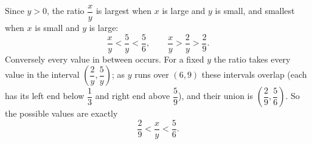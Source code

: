 Since $y>0$, the ratio $\dfrac{x}{y}$ is largest when $x$ is large and $y$ is small, and smallest when $x$ is small and $y$ is large:
\[
\dfrac{x}{y}<\dfrac{5}{y}<\dfrac{5}{6},\qquad \dfrac{x}{y}>\dfrac{2}{y}>\dfrac{2}{9}.
\]
Conversely every value in between occurs. For a fixed $y$ the ratio takes every value in the interval $\left(\dfrac{2}{y},\dfrac{5}{y}\right)$; as $y$ runs over $(6,9)$ these intervals overlap (each has its left end below $\dfrac{1}{3}$ and right end above $\dfrac{5}{9}$), and their union is $\left(\dfrac{2}{9},\dfrac{5}{6}\right)$. So the possible values are exactly
\[
\boxed{\dfrac{2}{9}<\dfrac{x}{y}<\dfrac{5}{6}} .
\]
